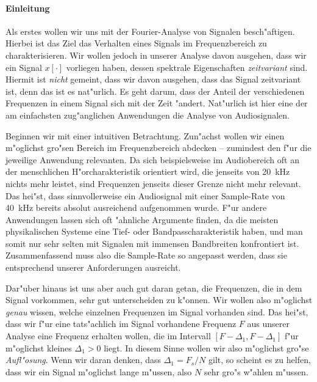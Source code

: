 \paragraph{Einleitung}\label{par:stft:intro}
%
Als erstes wollen wir uns mit der Fourier-Analyse von Signalen besch"aftigen.
Hierbei ist das Ziel das Verhalten eines Signals im Frequenzbereich zu charakterisieren.
Wir wollen jedoch in unserer Analyse davon ausgehen, dass wir ein Signal $x[\cdot]$ vorliegen haben, dessen spektrale Eigenschaften \emph{zeitvariant} sind.
Hiermit ist \emph{nicht} gemeint, dass wir davon ausgehen, dass das Signal zeitvariant ist, denn das ist es nat"urlich.
Es geht darum, dass der Anteil der verschiedenen Frequenzen in einem Signal sich mit der Zeit "andert.
Nat"urlich ist hier eine der am einfachsten zug"anglichen Anwendungen die Analyse von Audiosignalen.

Beginnen wir mit einer intuitiven Betrachtung.
Zun"achst wollen wir einen m"oglichst gro"sen Bereich im Frequenzbereich abdecken -- zumindest den f"ur die jeweilige Anwendung relevanten.
Da sich beispielsweise im Audiobereich oft an der menschlichen H"orcharakteristik orientiert wird, die jenseits von \SI{20}{\kilo\hertz} nichts mehr leistet, sind Frequenzen jenseits dieser Grenze nicht mehr relevant.
Das hei"st, dass sinnvollerweise ein Audiosignal mit einer Sample-Rate von \SI{40}{\kilo\hertz} bereits absolut ausreichend aufgenommen wurde.
F"ur andere Anwendungen lassen sich oft "ahnliche Argumente finden, da die meisten physikalischen Systeme eine Tief- oder Bandpasscharakteristik  haben, und man somit nur sehr selten mit Signalen mit immensen Bandbreiten konfrontiert ist.
Zusammenfassend muss also die Sample-Rate so angepasst werden, dass sie entsprechend unserer Anforderungen ausreicht.

Dar"uber hinaus ist uns aber auch gut daran getan, die Frequenzen, die in dem Signal vorkommen, sehr gut unterscheiden zu k"onnen.
Wir wollen also m"oglichst \emph{genau} wissen, welche einzelnen Frequenzen im Signal vorhanden sind. 
Das hei"st, dass wir f"ur eine tats"achlich im Signal vorhandene Frequenz $F$ aus unserer Analyse eine Frequenz erhalten wollen, die im Intervall $[F-\Delta_1,F-\Delta_1]$ f"ur m"oglichst kleines $\Delta_1 > 0$ liegt.
In diesem Sinne wollen wir also m"oglichst gro"se \emph{Aufl"osung}.
Wenn wir daran denken, dass $\Delta_1 = F_s/N$ gilt, so scheint es zu helfen, dass wir ein Signal m"oglichst lange  m"ussen, also $N$ sehr gro"s w"ahlen m"ussen.

